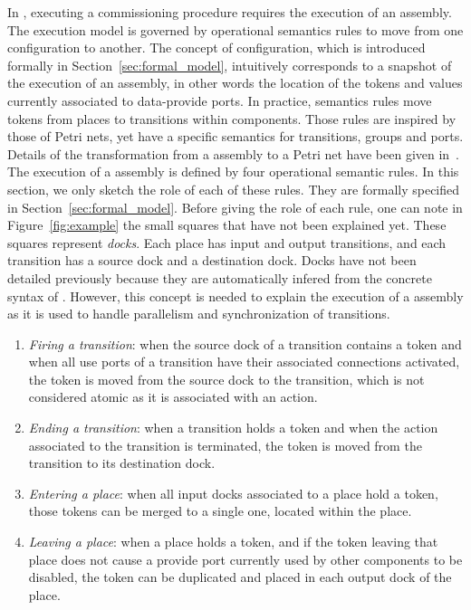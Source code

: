 In \mad, executing a commissioning procedure requires the execution of an
assembly. The \mad execution model is governed by operational
semantics rules to move from one configuration to another. The concept
of configuration, which is introduced formally in
Section~\ref{sec:formal_model}, intuitively corresponds to a snapshot
of the execution of an assembly, in other words the location of the
tokens and values currently associated to data-provide ports. In
practice, semantics rules move tokens from places to transitions within
components. Those rules are inspired by those of Petri nets, yet have
a specific semantics for transitions, groups and ports. Details of the
transformation from a \mad assembly to a Petri net have been given
in~\cite{coullon:hal-02323641}. The execution of a \mad assembly is
defined by four operational semantic rules. In this section, we only
sketch the role of each of these rules. They are formally specified in
Section~\ref{sec:formal_model}. Before giving the role of each rule,
one can note in Figure~\ref{fig:example} the small squares that have
not been explained yet. These squares represent \emph{docks}. Each
place has input and output transitions, and each transition has a
source dock and a destination dock. Docks have not been detailed
previously because they are automatically infered from the concrete
syntax of \mad. However, this concept is needed to explain the
execution of a \mad assembly as it is used to handle parallelism and
synchronization of transitions.
%
\begin{enumerate}
\item \emph{Firing a transition}: when the source dock of a transition
  contains a token and when all use ports of a transition have their
  associated connections activated, the token is moved from the source
  dock to the transition, which is not considered atomic as it is
  associated with an action.
\item \emph{Ending a transition}: when a transition holds a token and
  when the action associated to the transition is terminated, the
  token is moved from the transition to its destination dock.
\item \emph{Entering a place}: when all input docks associated to a
  place hold a token, those tokens can be merged to a single one, located
  within the place.
\item \emph{Leaving a place}: when a place holds a token, and if the
  token leaving that place does not cause a provide port currently
  used by other components to be disabled,
  the token can be duplicated and placed in each output dock of the
  place.
\end{enumerate}

